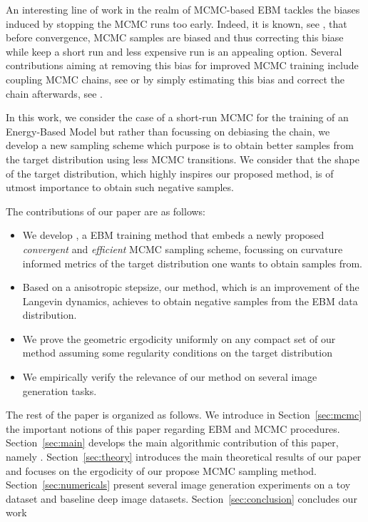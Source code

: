 \documentclass{article}
\begin{document}
An interesting line of work in the realm of MCMC-based EBM tackles the biases induced by stopping the MCMC runs too early. 
Indeed, it is known, see \citep{meyn2012markov}, that before convergence, MCMC samples are biased and thus correcting this biase while keep a short run and less expensive run is an appealing option.
Several contributions aiming at removing this bias for improved MCMC training include coupling MCMC chains, see \citep{qiu2019unbiased,jacob2020unbiased} or by simply estimating this bias and correct the chain afterwards, see \citep{du2020improved}.


In this work, we consider the case of a short-run MCMC for the training of an Energy-Based Model but rather than focussing on debiasing the chain, we develop a new sampling scheme which purpose is to obtain better samples from the target distribution using less MCMC transitions.
We consider that the shape of the target distribution, which highly inspires our proposed method, is of utmost importance to obtain such negative samples.

The contributions of our paper are as follows:

\begin{itemize}
\item We develop \algo, a EBM training method that embeds a newly proposed \emph{convergent} and \emph{efficient} MCMC sampling scheme, focussing on curvature informed metrics of the target distribution one wants to obtain samples from.
\item Based on a anisotropic stepsize, our method, which is an improvement of the Langevin dynamics, achieves to obtain negative samples from the EBM data distribution.
\item We prove the geometric ergodicity uniformly on any compact set of our method assuming some regularity conditions on the target distribution
\item We empirically verify the relevance of our method on several image generation tasks.
\end{itemize}

The rest of the paper is organized as follows.
We introduce in Section~\ref{sec:mcmc} the important notions of this paper regarding EBM and MCMC procedures.
Section~\ref{sec:main} develops the main algorithmic contribution of this paper, namely \algo.
Section~\ref{sec:theory} introduces the main theoretical results of our paper and focuses on the ergodicity of our propose MCMC sampling method.
Section~\ref{sec:numericals} present several image generation experiments on a toy dataset and baseline deep image datasets.
 Section~\ref{sec:conclusion} concludes our work
\end{document}
